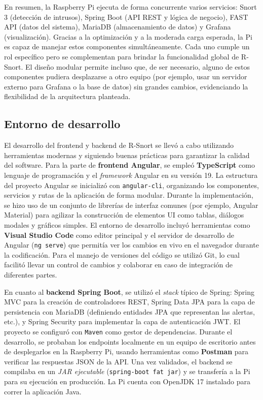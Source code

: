 \documentclass[11pt,a4paper,twoside]{report}
\begin{document}
En resumen, la Raspberry Pi ejecuta de forma concurrente varios servicios: Snort 3 (detección de intrusos), Spring Boot (API REST y lógica de negocio), FAST API (datos del sistema), MariaDB (almacenamiento de datos) y Grafana (visualización). Gracias a la optimización y a la moderada carga esperada, la Pi es capaz de manejar estos componentes simultáneamente. Cada uno cumple un rol específico pero se complementan para brindar la funcionalidad global de R-Snort. El diseño modular permite incluso que, de ser necesario, alguno de estos componentes pudiera desplazarse a otro equipo (por ejemplo, usar un servidor externo para Grafana o la base de datos) sin grandes cambios, evidenciando la flexibilidad de la arquitectura planteada.\newline

\subsection{Entorno de desarrollo}
El desarrollo del frontend y backend de R-Snort se llevó a cabo utilizando herramientas modernas y siguiendo buenas prácticas para garantizar la calidad del software. Para la parte de \textbf{frontend Angular}, se empleó \textbf{TypeScript} como lenguaje de programación y el \emph{framework} Angular en su versión 19. La estructura del proyecto Angular se inicializó con \texttt{angular-cli}, organizando los componentes, servicios y rutas de la aplicación de forma modular. Durante la implementación, se hizo uso de un conjunto de librerías de interfaz comunes (por ejemplo, Angular Material) para agilizar la construcción de elementos UI como tablas, diálogos modales y gráficos simples. El entorno de desarrollo incluyó herramientas como \textbf{Visual Studio Code} como editor principal y el servidor de desarrollo de Angular (\texttt{ng serve}) que permitía ver los cambios en vivo en el navegador durante la codificación. Para el manejo de versiones del código se utilizó Git, lo cual facilitó llevar un control de cambios y colaborar en caso de integración de diferentes partes.\newline

En cuanto al \textbf{backend Spring Boot}, se utilizó el \emph{stack} típico de Spring: Spring MVC para la creación de controladores REST, Spring Data JPA para la capa de persistencia con MariaDB (definiendo entidades JPA que representan las alertas, etc.), y Spring Security para implementar la capa de autenticación JWT. El proyecto se configuró con \texttt{Maven} como gestor de dependencias. Durante el desarrollo, se probaban los endpoints localmente en un equipo de escritorio antes de desplegarlos en la Raspberry Pi, usando herramientas como \textbf{Postman} para verificar las respuestas JSON de la API. Una vez validados, el backend se compilaba en un \emph{JAR ejecutable} (\texttt{spring-boot fat jar}) y se transfería a la Pi para su ejecución en producción. La Pi cuenta con OpenJDK 17 instalado para correr la aplicación Java.\newline
\end{document}

